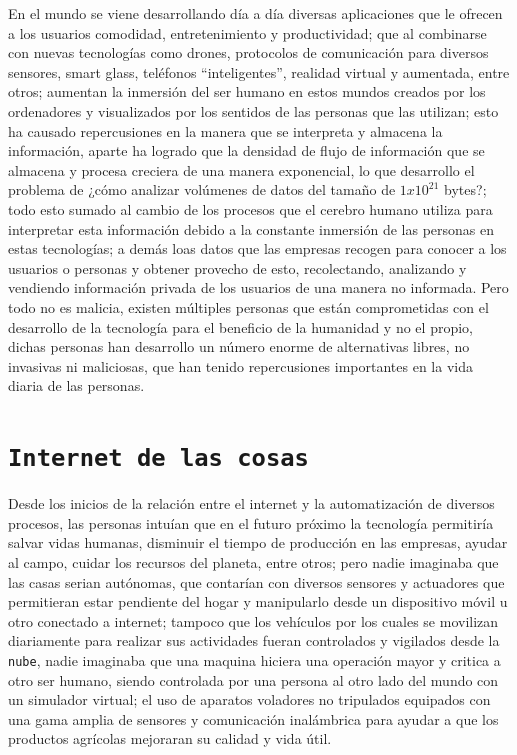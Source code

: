 \documentclass[jou]{apa6} %
\begin{document}
En el mundo se viene desarrollando día a día diversas aplicaciones que le ofrecen a los usuarios comodidad, entretenimiento y productividad; que al combinarse con nuevas tecnologías como drones, protocolos de comunicación para diversos sensores, smart glass, teléfonos “inteligentes”, realidad virtual y aumentada, entre otros; aumentan la inmersión del ser humano en estos mundos creados por los ordenadores y visualizados por los sentidos de las personas que las utilizan; esto ha causado repercusiones en la manera que se interpreta y almacena la información, aparte ha logrado que la densidad de flujo de información que se almacena y procesa creciera de una manera exponencial, lo que desarrollo  el problema de ¿cómo analizar volúmenes de datos del tamaño de $1 x10^{21}$ bytes?; todo esto sumado al cambio de \cite{carr2011superficiales} los procesos que el cerebro humano utiliza para interpretar esta información debido a la constante inmersión de las personas en estas tecnologías; a demás loas datos \cite{perez2016peligros} que las empresas recogen para conocer a los usuarios o personas y obtener provecho de esto, recolectando, analizando y vendiendo información privada de los usuarios de una manera no informada. Pero todo no es malicia, existen múltiples personas que están comprometidas con el desarrollo de la tecnología para el beneficio de la humanidad y no el propio, dichas personas han desarrollo un número enorme de alternativas libres, no invasivas ni maliciosas, que han tenido repercusiones importantes en la vida diaria de las personas.

\section{\texttt{Internet de las cosas}}

Desde los inicios de la relación entre el internet y la automatización de diversos procesos, las personas intuían que en el futuro próximo la tecnología permitiría salvar vidas humanas, disminuir el tiempo de producción en las empresas, ayudar al campo, cuidar los recursos del planeta, entre otros; pero nadie imaginaba que las casas serian autónomas, que contarían con diversos sensores y actuadores que permitieran estar pendiente del hogar y manipularlo desde un dispositivo móvil u otro conectado a internet; tampoco que los vehículos por los cuales se movilizan diariamente para realizar sus actividades fueran controlados y vigilados desde la \texttt{nube}, nadie imaginaba que una maquina hiciera una operación mayor y critica a otro ser humano, siendo controlada por una persona al otro lado del mundo con un simulador virtual; el uso de aparatos voladores no tripulados equipados con una gama amplia de sensores y comunicación inalámbrica para ayudar a que los productos agrícolas mejoraran su calidad y vida útil.
\end{document}
